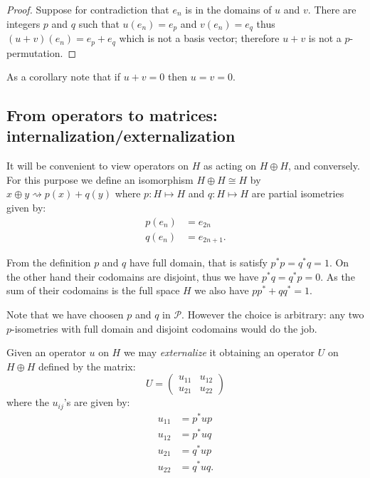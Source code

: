 \begin{proof}
Suppose for contradiction that $e_n$ is in the domains of $u$ and $v$. There are integers $p$ and $q$ such that $u(e_n) = e_p$ and $v(e_n) = e_q$ thus $(u+v)(e_n) = e_p + e_q$ which is not a basis vector; therefore $u+v$ is not a $p$-permutation.
\end{proof}

As a corollary note that if \(u+v=0\) then \(u=v=0\).


\subsection{From operators to matrices: internalization/externalization}\label{from-operators-to-matrices-internalizationexternalization}

It will be convenient to view operators on \(H\) as acting on
\(H\oplus H\), and conversely. For this purpose we define an isomorphism
\(H\oplus H \cong H\) by \(x\oplus y\rightsquigarrow p(x)+q(y)\) where
\(p:H\mapsto H\) and \(q:H\mapsto H\) are partial isometries given by:
\begin{align*}
p(e_n) &= e_{2n} \\
q(e_n) &= e_{2n+1}.
\end{align*}

From the definition \(p\) and \(q\) have full domain, that is satisfy
\(p^* p = q^* q = 1\). On the other hand their codomains are disjoint,
thus we have \(p^*q = q^*p = 0\). As the sum of their codomains is the
full space \(H\) we also have \(pp^* + qq^* = 1\).

Note that we have choosen \(p\) and \(q\) in \(\mathcal{P}\). However
the choice is arbitrary: any two \(p\)-isometries with full domain and
disjoint codomains would do the job.

Given an operator \(u\) on \(H\) we may \emph{externalize} it obtaining
an operator \(U\) on \(H\oplus H\) defined by the matrix:
\begin{equation*}
U = \begin{pmatrix}
  u_{11} & u_{12}\\
  u_{21} & u_{22}
  \end{pmatrix}
\end{equation*}
where the \(u_{ij}\)'s are given by:
\begin{align*}
u_{11} &= p^*up \\
u_{12} &= p^*uq \\
u_{21} &= q^*up \\
u_{22} &= q^*uq.
\end{align*}

